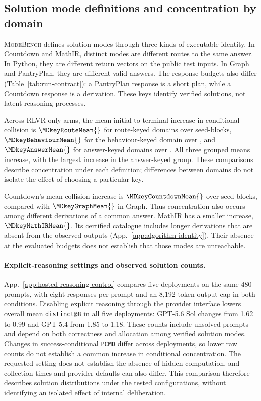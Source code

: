 \documentclass{article}
\newcommand{\1}{\mathbf 1}
\newcommand{\mb}{\textsc{ModeBench}}
\newcommand{\pmd}{\texttt{PCMD}}
\theoremstyle{remark}
\theoremstyle{definition}
\theoremstyle{plain}
\begin{document}
\subsection{Solution mode definitions and concentration by domain}
\label{app:mode-keying}

\mb{} defines solution modes through three kinds of executable identity.
In Countdown and MathIR, distinct modes are different routes to the same
answer. In Python, they are different return vectors on the public test
inputs. In Graph and PantryPlan, they are different valid answers. The
response budgets also differ (Table~\ref{tab:run-contract}): a PantryPlan
response is a short plan, while a Countdown response is a derivation.
These keys identify verified solutions, not latent reasoning processes.

Across RLVR-only arms, the mean initial-to-terminal increase in conditional
collision is $\MDkeyRouteMean{}$ for route-keyed domains over
\MDkeyRouteN{} seed-blocks, $\MDkeyBehaviourMean{}$ for the behaviour-keyed
domain over \MDkeyBehaviourN{}, and $\MDkeyAnswerMean{}$ for answer-keyed
domains over \MDkeyAnswerN{}. All three grouped means increase, with the
largest increase in the answer-keyed group. These comparisons describe
concentration under each definition; differences between domains do not
isolate the effect of choosing a particular key.

Countdown's mean collision increase is $\MDkeyCountdownMean{}$ over
\MDkeyCountdownN{} seed-blocks, compared with $\MDkeyGraphMean{}$ in Graph.
Thus concentration also occurs among different derivations of a common
answer. MathIR has a smaller increase, $\MDkeyMathIRMean{}$. Its certified
catalogue includes longer derivations that are absent from the observed
outputs (App.~\ref{app:algorithm-identity}). Their absence at the evaluated
budgets does not establish that those modes are unreachable.

\paragraph{Explicit-reasoning settings and observed solution counts.}
App.~\ref{app:hosted-reasoning-control} compares five deployments on the
same 480 prompts, with eight responses per prompt and an 8,192-token output
cap in both conditions. Disabling explicit reasoning through the provider
interface lowers overall mean \texttt{distinct@8} in all five deployments:
GPT-5.6 Sol changes from 1.62 to 0.99 and GPT-5.4 from 1.85 to 1.18.
These counts include unsolved prompts and depend on both correctness and
allocation among verified solution modes. Changes in success-conditional
\pmd{} differ across deployments, so lower raw counts do not establish a
common increase in conditional concentration. The requested setting does
not establish the absence of hidden computation, and collection times and
provider defaults can also differ. This comparison therefore describes
solution distributions under the tested configurations, without identifying
an isolated effect of internal deliberation.
\end{document}
